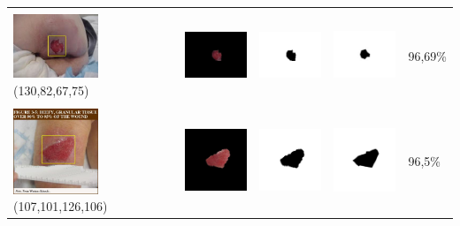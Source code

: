\begin{table}[H]
\begin{tabular}{|m{1.0in}|m{1.0in}|m{1.0in}|m{1.0in}|m{0.6in}|}
		&  &  & \\
		\includegraphics[width=1.0in]{gambar/hasil_segmentasi/luka_merah/image_39_rect.jpg} {\centering\fontsize{10}{10}\selectfont(130,82,67,75)}&
		\includegraphics[width=1.0in]{gambar/hasil_segmentasi/luka_merah/result_39.jpg}&
		\includegraphics[width=1.0in]{gambar/hasil_segmentasi/luka_merah/mask_r_39.jpg}&
		\includegraphics[width=1.0in]{gambar/hasil_segmentasi/luka_merah/39_r.jpg}&
		96,69\% \\
		\hline

				
		&  &  & \\
		\includegraphics[width=1.0in]{gambar/hasil_segmentasi/luka_merah/image_42_rect.jpg} {\centering\fontsize{10}{10}\selectfont(107,101,126,106)}&
		\includegraphics[width=1.0in]{gambar/hasil_segmentasi/luka_merah/result_42.jpg}&
		\includegraphics[width=1.0in]{gambar/hasil_segmentasi/luka_merah/mask_r_42.jpg}&
		\includegraphics[width=1.0in]{gambar/hasil_segmentasi/luka_merah/42_r.jpg}&
		96,5\% \\
		\hline


\end{tabular}
\end{table}
